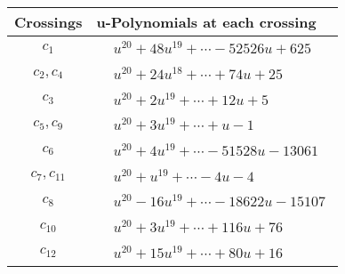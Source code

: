 \documentclass[1p]{elsarticle_modified}
\theoremstyle{definition}
\begin{document}
\begin{tabular}{m{50pt}|m{274pt}}
Crossings & \hspace{64pt}u-Polynomials at each crossing \\
\hline $$\begin{aligned}c_{1}\end{aligned}$$&$\begin{aligned}
&u^{20}+48 u^{19}+\cdots-52526 u+625
\end{aligned}$\\
\hline $$\begin{aligned}c_{2},c_{4}\end{aligned}$$&$\begin{aligned}
&u^{20}+24 u^{18}+\cdots+74 u+25
\end{aligned}$\\
\hline $$\begin{aligned}c_{3}\end{aligned}$$&$\begin{aligned}
&u^{20}+2 u^{19}+\cdots+12 u+5
\end{aligned}$\\
\hline $$\begin{aligned}c_{5},c_{9}\end{aligned}$$&$\begin{aligned}
&u^{20}+3 u^{19}+\cdots+u-1
\end{aligned}$\\
\hline $$\begin{aligned}c_{6}\end{aligned}$$&$\begin{aligned}
&u^{20}+4 u^{19}+\cdots-51528 u-13061
\end{aligned}$\\
\hline $$\begin{aligned}c_{7},c_{11}\end{aligned}$$&$\begin{aligned}
&u^{20}+u^{19}+\cdots-4 u-4
\end{aligned}$\\
\hline $$\begin{aligned}c_{8}\end{aligned}$$&$\begin{aligned}
&u^{20}-16 u^{19}+\cdots-18622 u-15107
\end{aligned}$\\
\hline $$\begin{aligned}c_{10}\end{aligned}$$&$\begin{aligned}
&u^{20}+3 u^{19}+\cdots+116 u+76
\end{aligned}$\\
\hline $$\begin{aligned}c_{12}\end{aligned}$$&$\begin{aligned}
&u^{20}+15 u^{19}+\cdots+80 u+16
\end{aligned}$\\
\hline
\end{tabular}\\~\\
\end{document}
